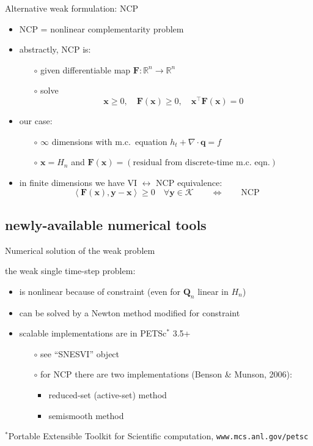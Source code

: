 \documentclass{beamer}
\newcommand\bq{\mathbf{q}}
\newcommand\bx{\mathbf{x}}
\newcommand\by{\mathbf{y}}
\newcommand\bF{\mathbf{F}}
\newcommand\bQ{\mathbf{Q}}
\newcommand{\Div}{\nabla\cdot}
\newcommand{\ip}[2]{\ensuremath{\left<#1,#2\right>}}
\newcommand\RR{\mathbb{R}}
\begin{document}
\begin{frame}{Alternative weak formulation: NCP}

\begin{itemize}
\item NCP = nonlinear complementarity problem
\item abstractly, NCP is:
  \begin{itemize}
  \item[$\circ$]  given differentiable map $\bF:\RR^n \to \RR^n$
  \item[$\circ$]  solve
     $$\bx \ge 0, \quad \bF(\bx) \ge 0, \quad \bx^\top \bF(\bx) = 0$$
  \end{itemize}
\item our case:
  \begin{itemize}
  \item[$\circ$]  $\infty$ dimensions with m.c.~equation $h_t + \Div\bq = f$
  \item[$\circ$]  $\bx = H_n$ and $\bF(\bx) = (\text{residual from discrete-time m.c.~eqn.})$
  \end{itemize}
\item in finite dimensions we have VI $\leftrightarrow$ NCP equivalence:
  $$\ip{\bF(\bx)}{\by-\bx} \ge 0 \quad \forall \by \in \mathcal{K} \qquad \iff \qquad \text{NCP}$$
\end{itemize}
\end{frame}


\subsection{newly-available numerical tools}

\begin{frame}{Numerical solution of the weak problem}

the weak single time-step problem:
\begin{itemize}
\item is nonlinear because of constraint (even for $\bQ_n$ linear in $H_n$)
\item can be solved by a Newton method modified for constraint
\item scalable implementations are in PETSc$^*$ 3.5+
  \begin{itemize}
  \item[$\circ$]  see ``SNESVI'' object
  \item[$\circ$]  for NCP there are two implementations (Benson \& Munson, 2006):
    \begin{itemize}
    \item  reduced-set (active-set) method
    \item  semismooth method
    \end{itemize}
  \end{itemize}
\end{itemize}

\vspace{15mm}
{\scriptsize $^*$Portable Extensible Toolkit for Scientific computation, \texttt{www.mcs.anl.gov/petsc}}
\end{frame}
\end{document}

